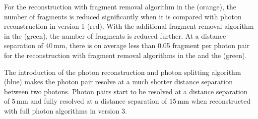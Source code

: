 

For the reconstruction with fragment removal algorithm in the \ECAL (orange), the number of fragments is reduced significantly when it is compared with photon reconstruction in \pandora version 1 (red). With the additional fragment removal algorithm in the \HCAL (green), the number of fragments is reduced further. At a distance separation of  40\,mm,  there is on average less than 0.05 fragment per photon pair for the reconstruction with fragment removal algorithms in the \ECAL and the \HCAL  (green).

The introduction of the photon reconstruction and photon splitting algorithm (blue) makes the photon pair resolve at a much shorter distance separation between two photons. Photon pairs start to be resolved at a distance separation of 5\,mm and fully resolved at a distance separation of 15\,mm when reconstructed with full photon algorithms in \pandora version 3.


